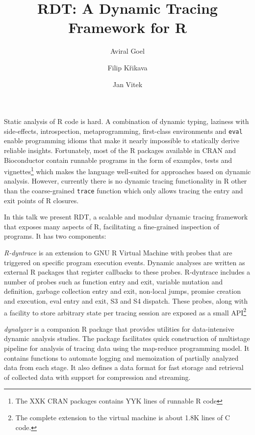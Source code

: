 \documentclass[acmsmall,review]{acmart}
\title{RDT: A Dynamic Tracing Framework for R}
\author{Aviral Goel}
\affiliation{
  \institution{Northeastern University}
  \country{USA}
}
\author{Filip Křikava}
\affiliation{
  \institution{Czech Technical University}
  \country{Czechia}
}
\author{Jan Vitek}
\affiliation{
  \institution{Northeastern University}
  \country{USA}
}
\affiliation{
  \institution{Czech Technical University}
  \country{Czechia}
}
\newcommand{\code}[1]{\lstinline|#1|\xspace}
\newcommand{\RDT}{RDT\xspace}
\newcommand{\RDyntrace}{R-dyntrace\xspace}
\newcommand{\dynalyzer}{dynalyzer\xspace}
\begin{document}
\maketitle

\vspace{-1mm}

Static analysis of R code is hard. A combination of dynamic typing, laziness
with side-effects, introspection, metaprogramming, first-class environments and
\code{eval} enable programming idioms that make it nearly impossible to
statically derive reliable insights. Fortunately, most of the R packages
available in CRAN and Bioconductor contain runnable programs in the form of
examples, tests and vignettes\footnote{The XXK CRAN packages contains YYK lines
of runnable R code} which makes the language well-suited for approaches based on
dynamic analysis.
%
However, currently there is no dynamic tracing functionality in R other than the
coarse-grained \code{trace} function which only allows tracing the entry and exit
points of R closures.

In this talk we present \RDT, a scalable and modular dynamic tracing framework
that exposes many aspects of R, facilitating a fine-grained inspection of
programs. It has two components:
%
\begin{compactitem}[$-$]
\item \emph{\RDyntrace} is an extension to GNU R Virtual Machine with probes
  that are triggered on specific program execution events. Dynamic analyses are
  written as external R packages that register callbacks to these probes. \RDyntrace
  includes a number of probes such as function entry and exit, variable mutation
  and definition, garbage collection entry and exit, non-local jumps, promise
  creation and execution, eval entry and exit, S3 and S4 dispatch. These probes,
  along with a facility to store arbitrary state per tracing session are exposed
  as a small API\footnote{The complete extension to the virtual machine is about
    1.8K lines of C code.}
\item \emph{\dynalyzer} is a companion R package that provides utilities for
  data-intensive dynamic analysis studies. The package facilitates quick
  construction of multistage pipeline for analysis of tracing data using the
  map-reduce programming model. It contains functions to automate logging and
  memoization of partially analyzed data from each stage. It also defines a data
  format for fast storage and retrieval of collected data with support for
  compression and streaming.
\end{compactitem}
\end{document}
